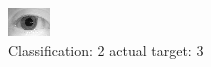 \begin{figure}[h!]
\begin{center}
\includegraphics[width=0.60\columnwidth]{figures/ID1056_class_2_target_3.png}
\end{center}
\caption{ Classification: 2 actual target: 3}
\label{fig:ID1056_class_2_target_3}
\end{figure}
